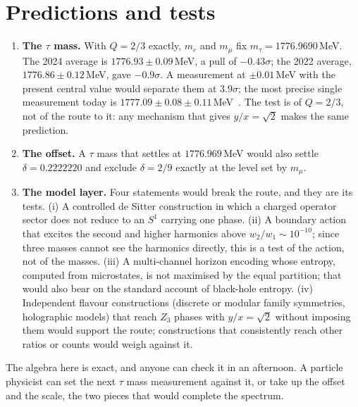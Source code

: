 \section{Predictions and tests}\label{sec:ko:tests}
\begin{enumerate}
\item \textbf{The $\tau$ mass.} With $Q=2/3$ exactly, $m_e$ and $m_\mu$ fix $m_\tau=1776.9690$\,MeV. The 2024 average is $1776.93\pm0.09$\,MeV, a
pull of $-0.43\sigma$; the 2022 average, $1776.86\pm0.12$\,MeV, gave $-0.9\sigma$. \calc{} A measurement at $\pm0.01$\,MeV with the present
central value would separate them at $3.9\sigma$; the most precise single measurement today is $1777.09\pm0.08\pm0.11$\,MeV~\cite{BelleII2023tau}.
\prediction{} The test is of $Q=2/3$, not of the route to it: any mechanism that gives $y/x=\sqrt2$ makes the same prediction.
\item \textbf{The offset.} A $\tau$ mass that settles at $1776.969$\,MeV would also settle $\delta=0.2222220$ and exclude $\delta=2/9$ exactly at
the level set by $m_\mu$. \calc
\item \textbf{The model layer.} Four statements would break the route, and they are its tests. (i) A controlled de Sitter construction in which a
charged operator sector does not reduce to an $S^1$ carrying one phase. (ii) A boundary action that excites the second and higher harmonics
above $w_2/w_1\sim10^{-10}$; since three masses cannot see the harmonics directly, this is a test of the action, not of the masses. (iii) A
multi-channel horizon encoding whose entropy, computed from microstates, is not maximised by the equal partition; that would also bear on the
standard account of black-hole entropy. (iv) Independent flavour constructions (discrete or modular family symmetries, holographic models)
that reach $Z_3$ phases with $y/x=\sqrt2$ without imposing them would support the route; constructions that consistently reach other ratios or
counts would weigh against it. \openprob
\end{enumerate}

The algebra here is exact, and anyone can check it in an afternoon. A particle physicist can set the next $\tau$ mass measurement against it, or take up the offset and the scale, the two pieces that would complete the spectrum.

